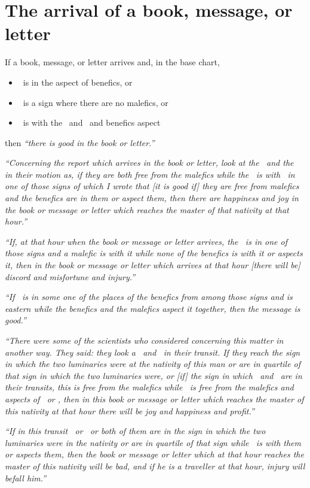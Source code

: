 \section{The arrival of a book, message, or letter}
If a book, message, or letter arrives and, in the base chart, 
\begin{itemize}[topsep=0em,itemsep=0em]
\item \Mercury\, is in the aspect of benefics, or
\item \Mercury\, is a sign where there are no malefics, or
\item \Mercury\, is with the \Sun\, and \Moon\, and benefics aspect
\end{itemize}
then \textsl{``there is good in the book or letter.''}

\textsl{``Concerning the report which arrives in the book or letter, look at the \Sun\, and the \Moon\, in their motion as, if they are both free from the malefics while the \Moon\, is with \Mercury\, in one of those signs of which I wrote that [it is good if] they are free from malefics and the benefics are in them or aspect them, then there are happiness and joy in the book or message or letter which reaches the master of that nativity at that hour.''}

\textsl{``If, at that hour when the book or message or letter arrives, the \Moon\, is in one of those signs and a malefic is with it while none of the benefics is with it or aspects it, then in the book or message or letter which arrives at that hour [there will be] discord and misfortune and injury.''}

\textsl{``If \Mercury\, is in some one of the places of the benefics from among those signs and is eastern while the benefics and the malefics aspect it together, then the message is good.''} 

\textsl{``There were some of the scientists who considered concerning this matter in another way. They said: they look a \Jupiter\, and \Venus\, in their transit. If they reach the sign in which the two luminaries were at the nativity of this man or are in quartile of that sign in which the two luminaries were, or [if] the sign in which \Jupiter\, and \Venus\, are in their transits, this is free from the malefics while \Mercury\, is free from the malefics and aspects of \Jupiter\, or \Venus, then in this book or message or letter which reaches the master of this nativity at that hour there will be joy and happiness and profit.''}

\textsl{``If in this transit \Saturn\, or \Mars\, or both of them are in the sign in which the two luminaries were in the nativity or are in quartile of that sign while \Mercury\, is with them or aspects them, then the book or message or letter which at that hour reaches the master of this nativity will be bad, and if he is a traveller at that hour, injury will befall him.''}